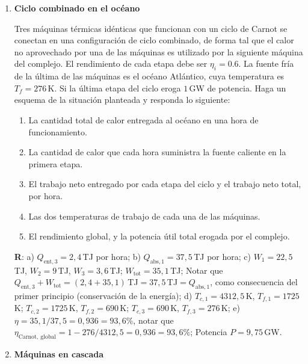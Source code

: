 \documentclass[a4paper,12pt]{article}
\begin{document}
\begin{enumerate}
	\item {\bf{Ciclo combinado en el océano}} 
		
		Tres máquinas térmicas idénticas que funcionan con un ciclo de Carnot
		se conectan en una configuración de ciclo combinado, de forma tal que
		el calor no aprovechado por una de las máquinas es utilizado por la
		siguiente máquina del complejo.  El rendimiento de cada etapa debe ser
		$\eta_i=0.6$. La fuente fría de la última de las máquinas es el océano
		Atlántico, cuya temperatura es $T_f=276$\,K. Si la última etapa del
		ciclo eroga $1$\,GW de potencia. Haga un esquema de la situación
		planteada y responda lo siguiente:
		\begin{enumerate} 
			\item La cantidad total de calor entregada al océano en una hora de
				funcionamiento.
			\item La cantidad de calor que cada hora suministra la fuente
				caliente en la primera etapa.
			\item El trabajo neto entregado por cada etapa del ciclo y el
				trabajo neto total, por hora.
			\item Las dos temperaturas de trabajo de cada una de las máquinas.
			\item El rendimiento global, y la potencia útil total erogada por
				el complejo.
		\end{enumerate}
		{\bf{R}}: a) $Q_{\mathrm{ent,3}}=2,4$\,TJ por hora; b) $Q_{\mathrm{abs,1}}=37,5$\,TJ por hora; c) $W_1=22,5$\,TJ, $W_2=9$\,TJ, $W_3=3,6$\,TJ; $W_{\mathrm{tot}}=35,1$\,TJ; Notar que $Q_{\mathrm{ent,3}} + W_{\mathrm{tot}} = (2,4 + 35,1)$\,TJ$=37,5$\,TJ$=Q_{\mathrm{abs,1}}$, como consecuencia del primer principio (conservación de la energía); d) $T_{c,1} = 4312,5$\,K, $T_{f,1} = 1725$\,K; $T_{c,2} = 1725$\,K, $T_{f,2} = 690$\,K; $T_{c,3} = 690$\,K, $T_{f,3} = 276$\,K; e) $\eta=35,1/37,5=0,936=93,6\%$, notar que $\eta_{\mathrm{Carnot,\ global}} = 1 - 276/4312,5=0,936=93,6\%$; Potencia $P=9,75$\,GW.
	\item {\bf{Máquinas en cascada}}
		

\end{enumerate}
\end{document}

